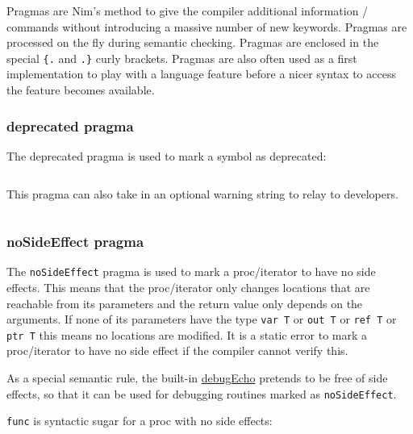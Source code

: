 Pragmas are Nim's method to give the compiler additional information /
commands without introducing a massive number of new keywords. Pragmas
are processed on the fly during semantic checking. Pragmas are enclosed
in the special \texttt{\{.} and \texttt{.\}} curly brackets. Pragmas are
also often used as a first implementation to play with a language
feature before a nicer syntax to access the feature becomes available.

\hypertarget{deprecated-pragma}{%
\subsubsection{deprecated pragma}\label{deprecated-pragma}}

The deprecated pragma is used to mark a symbol as deprecated:

\begin{verbatim}
\end{verbatim}

This pragma can also take in an optional warning string to relay to
developers.

\begin{verbatim}
\end{verbatim}

\hypertarget{nosideeffect-pragma}{%
\subsubsection{noSideEffect pragma}\label{nosideeffect-pragma}}

The \texttt{noSideEffect} pragma is used to mark a proc/iterator to have
no side effects. This means that the proc/iterator only changes
locations that are reachable from its parameters and the return value
only depends on the arguments. If none of its parameters have the type
\texttt{var\ T} or \texttt{out\ T} or \texttt{ref\ T} or \texttt{ptr\ T}
this means no locations are modified. It is a static error to mark a
proc/iterator to have no side effect if the compiler cannot verify this.

As a special semantic rule, the built-in
\href{system.html\#debugEcho,varargs\%5Btyped,\%5D}{debugEcho} pretends
to be free of side effects, so that it can be used for debugging
routines marked as \texttt{noSideEffect}.

\texttt{func} is syntactic sugar for a proc with no side effects:

\begin{verbatim}
\end{verbatim}

